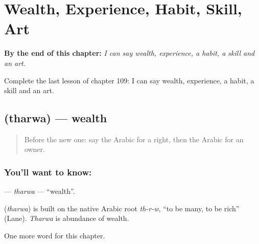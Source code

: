 
\chapter{Wealth, Experience, Habit, Skill, Art}
\label{ch:ar-wealth-experience-habit-skill-art}

\begin{chapteropening}
\textbf{By the end of this chapter:} \emph{I can say wealth, experience, a habit, a skill and an art.}

Complete the last lesson of chapter 109: I can say wealth, experience, a habit, a skill and an art.
\end{chapteropening}

\section[\texorpdfstring{\ar{ثروة} (tharwa)}{ثروة (tharwa)}]{ (tharwa) — wealth}

\label{lesson:AR-C109-tharwa}



\begin{quote}
Before the new one: say the Arabic for a right, then the Arabic for an owner.
\end{quote}

\subsection*{You'll want to know: }
\textbf{} — \emph{tharwa} — \textquotedblleft{}wealth\textquotedblright{}.

\begin{cousinweb}
\textbf{} (\emph{tharwa}) is built on the native Arabic root \emph{th-r-w}, \textquotedblleft{}to be many, to be rich\textquotedblright{} (Lane). \emph{Tharwa} is abundance of wealth.
\end{cousinweb}

\begin{grammarlens}[title={What you've built}]
One more word for this chapter.
\end{grammarlens}

